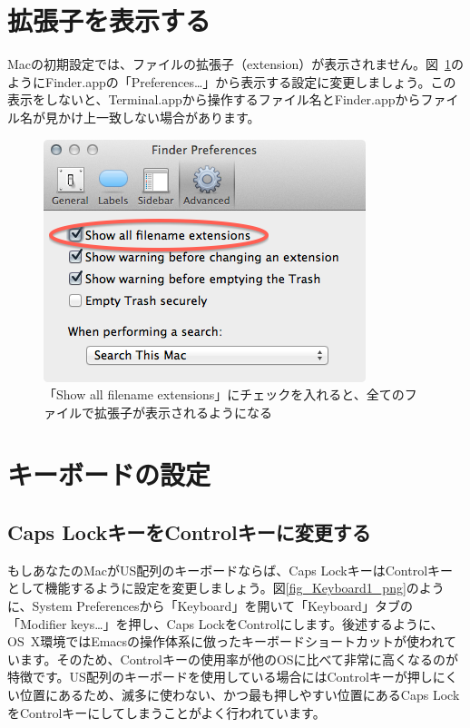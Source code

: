 \section{拡張子を表示する}
Macの初期設定では、ファイルの拡張子（extension）が表示されません。図~\ref{fig_Extension_png}のようにFinder.appの「Preferences\ldots」から表示する設定に変更しましょう。この表示をしないと、Terminal.appから操作するファイル名とFinder.appからファイル名が見かけ上一致しない場合があります。

\begin{figure}
  \begin{center}
    \includegraphics[scale=0.35,bb= 0 0 355 267]{fig/Extension.png}
    \caption{「Show all filename extensions」にチェックを入れると、全てのファイルで拡張子が表示されるようになる}
    \label{fig_Extension_png}
  \end{center}
\end{figure}

\section{キーボードの設定}

\subsection{Caps LockキーをControlキーに変更する}
もしあなたのMacがUS配列のキーボードならば、Caps LockキーはControlキーとして機能するように設定を変更しましょう。図\ref{fig_Keyboard1_png}のように、System Preferencesから「Keyboard」を開いて「Keyboard」タブの「Modifier keys\ldots」を押し、Caps LockをControlにします。後述するように、OS~X環境ではEmacsの操作体系に倣ったキーボードショートカットが使われています。そのため、Controlキーの使用率が他のOSに比べて非常に高くなるのが特徴です。US配列のキーボードを使用している場合にはControlキーが押しにくい位置にあるため、滅多に使わない、かつ最も押しやすい位置にあるCaps LockをControlキーにしてしまうことがよく行われています。

